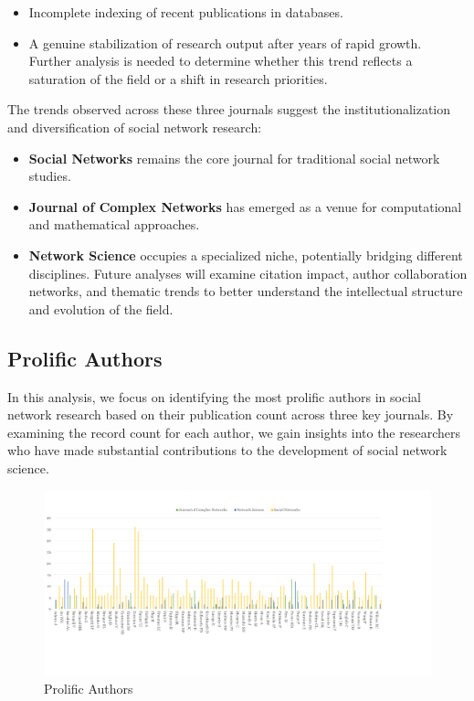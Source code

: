 \documentclass[twocolumn]{article}
\begin{document}
\begin{enumerate}
		\begin{itemize}
			\item Incomplete indexing of recent publications in databases.
			\item A genuine stabilization of research output after years of rapid growth. Further analysis is needed to determine whether this trend reflects a saturation of the field or a shift in research priorities.
		\end{itemize}
		
	\end{enumerate}
	
	The trends observed across these three journals suggest the institutionalization and diversification of social network research:
	
	\begin{itemize}
		\item \textbf{Social Networks} remains the core journal for traditional social network studies.
		\item \textbf{Journal of Complex Networks} has emerged as a venue for computational and mathematical approaches.
		\item \textbf{Network Science} occupies a specialized niche, potentially bridging different disciplines. Future analyses will examine citation impact, author collaboration networks, and thematic trends to better understand the intellectual structure and evolution of the field.
	\end{itemize}
	
	\subsection{Prolific Authors}
	
	In this analysis, we focus on identifying the most prolific authors in social network research based on their publication count across three key journals. By examining the record count for each author, we gain insights into the researchers who have made substantial contributions to the development of social network science. 
	
	\begin{figure}[htbp]
		\caption{Prolific Authors}\label{fig.fig2}
		\includegraphics[width=\columnwidth]{images/Record Count of Top 100 Authors.pdf}
	\end{figure}
	
\end{document}
